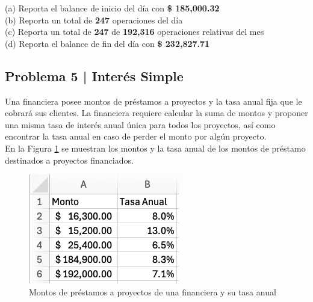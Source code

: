 \documentclass{article}
\begin{document}
\noindent
(a) Reporta el balance de inicio del día con \textbf{\$ 185,000.32}
\\[6pt]
(b) Reporta un total de \textbf{247} operaciones del día
\\[6pt]
(c) Reporta un total de \textbf{247} de \textbf{192,316} operaciones relativas del mes
\\[6pt]
(d) Reporta el balance de fin del día con \textbf{\$ 232,827.71}
\\[6pt]

\subsection*{Problema 5 | Interés Simple}

Una financiera posee montos de préstamos a proyectos y la tasa anual fija que le cobrará sus clientes. La financiera requiere calcular la suma de montos y proponer una misma tasa de interés anual única para todos los proyectos, así como encontrar la tasa anual en caso de perder el monto por algún proyecto.
\\[12pt]
En la Figura \ref{fig:p105} se muestran los montos y la tasa anual de los montos de préstamo destinados a proyectos financiados.
\begin{figure}[!h]
    \centering
    \begin{minipage}{\textwidth}
        \centering
        \includegraphics[width=\textwidth]{figures/p105.png}
    \end{minipage}
    \captionsetup{width=0.9\textwidth}
    \caption{Montos de préstamos a proyectos de una financiera y su tasa anual}
    \label{fig:p105}
\end{figure}
\\
\end{document}
